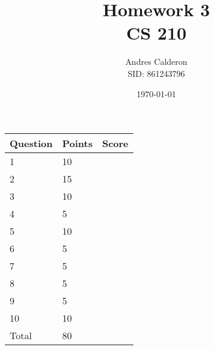 \documentclass{article}
\title{Homework 3\\CS 210}
\author{Andres Calderon \\ SID: 861243796}
\date{\today}
\begin{document}
\maketitle

\begin{center}
\begin{tabular}{|l|l|p{.4in}|}
\hline Question & Points & Score \\
\hline  1 & 10 & \\
\hline  2 & 15 & \\
\hline  3 & 10 & \\
\hline  4 &  5 & \\
\hline  5 & 10 & \\
\hline  6 &  5 & \\
\hline  7 &  5 & \\
\hline  8 &  5 & \\
\hline  9 &  5 & \\
\hline 10 & 10 & \\
\hline Total & 80 & \\
\hline 
\end{tabular}
\end{center}
\end{document}
